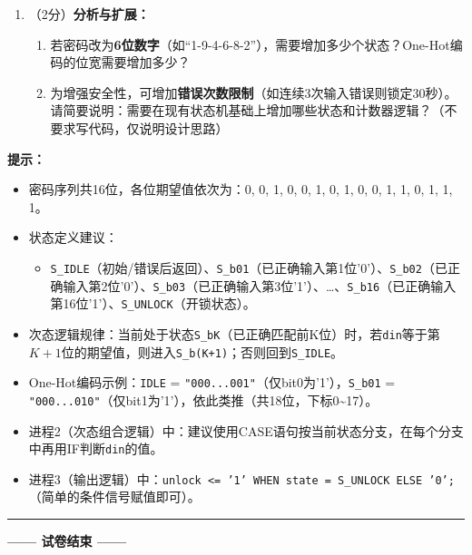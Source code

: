 \begin{enumerate}[label=(\arabic*)]
  \item （2分）\textbf{分析与扩展：}
  \begin{enumerate}
    \item 若密码改为\textbf{6位数字}（如``1-9-4-6-8-2''），需要增加多少个状态？One-Hot编码的位宽需要增加多少？
    \item 为增强安全性，可增加\textbf{错误次数限制}（如连续3次输入错误则锁定30秒）。请简要说明：需要在现有状态机基础上增加哪些状态和计数器逻辑？（不要求写代码，仅说明设计思路）
  \end{enumerate}
\end{enumerate}

\begin{framed}
\textbf{提示：}
\begin{itemize}
  \item 密码序列共16位，各位期望值依次为：0, 0, 1, 0,  0, 1, 0, 1,  0, 0, 1, 1,  0, 1, 1, 1。
  \item 状态定义建议：
  \begin{itemize}
    \item \texttt{S\_IDLE}（初始/错误后返回）、\texttt{S\_b01}（已正确输入第1位'0'）、\texttt{S\_b02}（已正确输入第2位'0'）、\texttt{S\_b03}（已正确输入第3位'1'）、\dots、\texttt{S\_b16}（已正确输入第16位'1'）、\texttt{S\_UNLOCK}（开锁状态）。
  \end{itemize}
  \item 次态逻辑规律：当前处于状态\texttt{S\_bK}（已正确匹配前K位）时，若\texttt{din}等于第$K+1$位的期望值，则进入\texttt{S\_b(K+1)}；否则回到\texttt{S\_IDLE}。
  \item One-Hot编码示例：\texttt{IDLE} = \texttt{"000...001"}（仅bit0为'1'），\texttt{S\_b01} = \texttt{"000...010"}（仅bit1为'1'），依此类推（共18位，下标0\~{}17）。
  \item 进程2（次态组合逻辑）中：建议使用CASE语句按当前状态分支，在每个分支中再用IF判断\texttt{din}的值。
  \item 进程3（输出逻辑）中：\texttt{unlock <= '1' WHEN state = S\_UNLOCK ELSE '0';}（简单的条件信号赋值即可）。
\end{itemize}
\end{framed}

\vspace{0.8cm}
{\centering
\rule{0.8\textwidth}{0.5pt}
\vspace{0.3cm}

\textbf{—— 试卷结束 ——}

\vspace{0.5cm}}

\endinput
